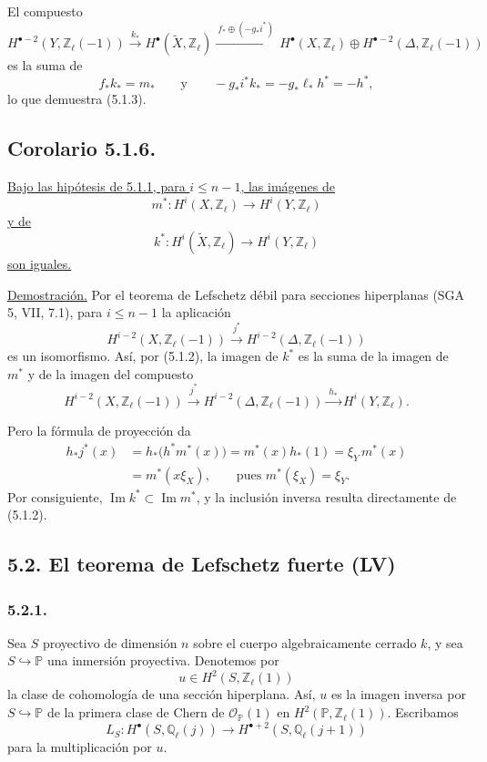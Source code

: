 El compuesto
\[
H^{\bullet-2}(Y,\mathbb Z_\ell(-1))
\xrightarrow{\ k_*\ }
H^\bullet(\widetilde X,\mathbb Z_\ell)
\xrightarrow{\ f_*\oplus(-g_*i^*)\ }
H^\bullet(X,\mathbb Z_\ell)\oplus
H^{\bullet-2}(\Delta,\mathbb Z_\ell(-1))
\]
es la suma de
\[
f_*k_*=m_*
\qquad\text{y}\qquad
-g_*i^*k_*=-g_*\ell_*h^*=-h^*,
\]
lo que demuestra (5.1.3).

\subsection*{Corolario 5.1.6.}
\underline{Bajo las hipótesis de 5.1.1, para $i\leq n-1$, las imágenes
de}
\[
m^*:H^i(X,\mathbb Z_\ell)\longrightarrow H^i(Y,\mathbb Z_\ell)
\]
\underline{y de}
\[
k^*:H^i(\widetilde X,\mathbb Z_\ell)
   \longrightarrow H^i(Y,\mathbb Z_\ell)
\]
\underline{son iguales.}

\noindent\underline{Demostración.}
Por el teorema de Lefschetz débil para secciones hiperplanas
(SGA 5, VII, 7.1), para $i\leq n-1$ la aplicación
\begin{equation}\tag{5.1.7}
H^{i-2}(X,\mathbb Z_\ell(-1))
\xrightarrow{\ j^*\ }
H^{i-2}(\Delta,\mathbb Z_\ell(-1))
\end{equation}
es un isomorfismo. Así, por (5.1.2), la imagen de $k^*$ es la suma de
la imagen de $m^*$ y de la imagen del compuesto
\[
H^{i-2}(X,\mathbb Z_\ell(-1))
\xrightarrow{\ j^*\ }
H^{i-2}(\Delta,\mathbb Z_\ell(-1))
\xrightarrow{\ h_*\ }
H^i(Y,\mathbb Z_\ell).
\]

\pageoriginale

Pero la fórmula de proyección da
\[
\begin{aligned}
h_*j^*(x)
 &=h_*\bigl(h^*m^*(x)\bigr)
  =m^*(x)h_*(1)
  =\xi_Y\,m^*(x)\\
 &=m^*(x\xi_X),
 \qquad\text{pues }m^*(\xi_X)=\xi_Y.
\end{aligned}
\]
Por consiguiente, $\operatorname{Im}k^*\subset\operatorname{Im}m^*$,
y la inclusión inversa resulta directamente de (5.1.2).

\subsection*{5.2. El teorema de Lefschetz fuerte (LV)}

\subsubsection*{5.2.1.}
Sea $S$ proyectivo de dimensión $n$ sobre el cuerpo algebraicamente
cerrado $k$, y sea $S\hookrightarrow\mathbb P$ una inmersión
proyectiva. Denotemos por
\[
u\in H^2(S,\mathbb Z_\ell(1))
\]
la clase de cohomología de una sección hiperplana. Así, $u$ es la
imagen inversa por $S\hookrightarrow\mathbb P$ de la primera clase de
Chern de $\mathcal O_{\mathbb P}(1)$ en
$H^2(\mathbb P,\mathbb Z_\ell(1))$. Escribamos
\[
L_S:H^\bullet(S,\mathbb Q_\ell(j))
   \longrightarrow H^{\bullet+2}(S,\mathbb Q_\ell(j+1))
\]
para la multiplicación por $u$.

